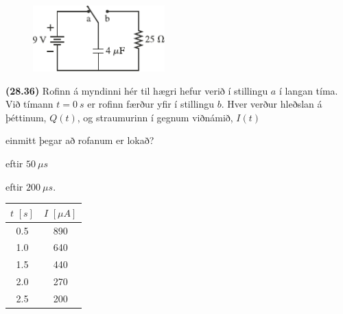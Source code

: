 \begin{enumerate}[label = \textbf{(\alph*)}]

\begin{minipage}{\linewidth}
\begin{figure}
\vspace{-0.5cm}
\includegraphics[width = 2in]{figures/rk2836.pdf}
\end{figure}

\item[\textbf{(28.36)}] Rofinn á myndinni hér til hægri hefur verið í stillingu $a$ í langan tíma. Við tímann $t = \SI{0}{s}$ er rofinn færður yfir í stillingu $b$. Hver verður hleðslan á þéttinum, $Q(t)$, og straumurinn í gegnum viðnámið, $I(t)$ \begin{enumerate*}[label = \textbf{(\alph*)}]
    \item einmitt þegar að rofanum er lokað?
    \item eftir $\SI{50}{\mu s}$
    \item eftir $\SI{200}{\mu s}$.
\end{enumerate*}

\end{minipage}

\vspace{1cm}

\begin{minipage}{\linewidth}
\begin{table}
\vspace{-0.5cm}
\begin{tabular}{|c|c|}
        \hline
          $t \, \, [\si{s}]$   &  $I \, \, [\si{\mu A}]$ \\ \hline \hline
            \SI{0.5}{} & \SI{890}{} \\ \hline
            \SI{1.0}{} & \SI{640}{} \\ \hline
            \SI{1.5}{} & \SI{440}{} \\ \hline
            \SI{2.0}{} & \SI{270}{} \\ \hline
            \SI{2.5}{} & \SI{200}{} \\ \hline
        \end{tabular}
\end{table}


\end{minipage}
\end{enumerate}
